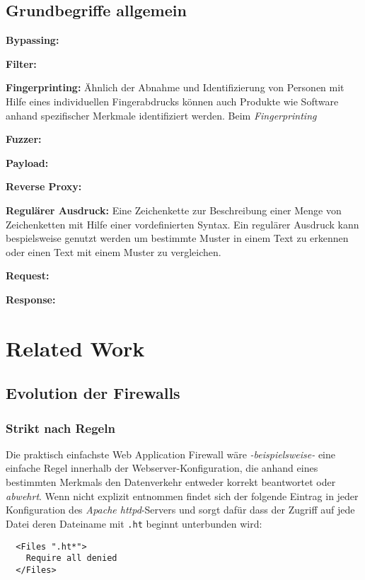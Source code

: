 \subsection{Grundbegriffe allgemein}

\textbf{Bypassing:}

\textbf{Filter:}

\textbf{Fingerprinting:} Ähnlich der Abnahme und Identifizierung von Personen mit Hilfe eines individuellen Fingerabdrucks können auch Produkte wie Software anhand spezifischer Merkmale identifiziert werden. Beim \emph{Fingerprinting}

\textbf{Fuzzer:}

\textbf{Payload:}

\textbf{Reverse Proxy:}

\textbf{Regulärer Ausdruck:} Eine Zeichenkette zur Beschreibung einer Menge von Zeichenketten mit Hilfe einer vordefinierten Syntax. Ein regulärer Ausdruck kann bespielsweise genutzt werden um bestimmte Muster in einem Text zu erkennen oder einen Text mit einem Muster zu vergleichen.

\textbf{Request:} 

\textbf{Response:}

\section{Related Work} %

\subsection{Evolution der Firewalls}

\subsubsection{Strikt nach Regeln}

Die praktisch einfachste Web Application Firewall wäre \emph{-beispielsweise-} eine einfache Regel innerhalb der Webserver-Konfiguration, die anhand eines bestimmten Merkmals den Datenverkehr entweder korrekt beantwortet oder \glqq\emph{abwehrt}\grqq. Wenn nicht explizit entnommen findet sich der folgende Eintrag in jeder Konfiguration des \emph{Apache httpd}-Servers und sorgt dafür dass der Zugriff auf jede Datei deren Dateiname mit \texttt{.ht} beginnt unterbunden wird:

\begin{lstlisting}
  <Files ".ht*">
    Require all denied
  </Files>
\end{lstlisting}

